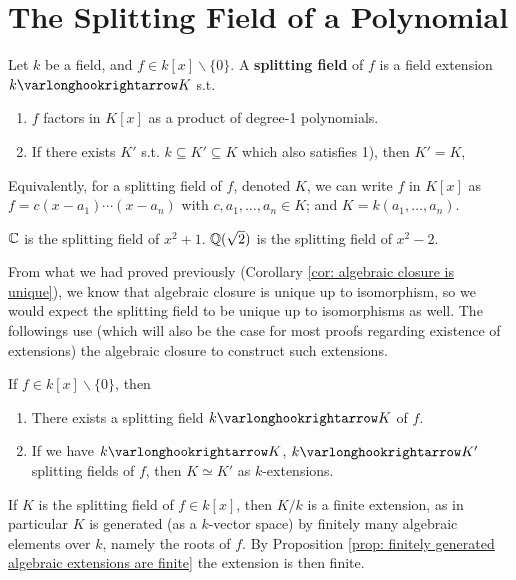\section{The Splitting Field of a Polynomial}

\begin{definition}
    Let $k$ be a field, and $f \in k[x] \smallsetminus \{0\}$. A \textbf{splitting field} of $f$ is a field extension $k \ext K$ s.t. 
    \begin{enumerate}[label=\arabic*)]
        \item $f$ factors in $K[x]$ as a product of degree-1 polynomials.
        \item If there exists $K'$ s.t. $k \subseteq K' \subseteq K$ which also satisfies 1), then $K' = K$,
    \end{enumerate}
    Equivalently, for a splitting field of $f$, denoted $K$, we can write $f$ in $K[x]$ as $f = c(x - a_1) \cdots (x - a_n)$ with $c, a_1, \dots, a_n \in K$; and $K = k(a_1, \dots, a_n)$. 
\end{definition}

\begin{example}
    $\mathbb{C}$ is the splitting field of $x^2 + 1$. $\mathbb{Q}(\sqrt{2})$ is the splitting field of $x^2 - 2$.
\end{example}

\textstart
From what we had proved previously (Corollary \ref{cor: algebraic closure is unique}), we know that algebraic closure is unique up to isomorphism, so we would expect the splitting field to be unique up to isomorphisms as well. The followings use (which will also be the case for most proofs regarding existence of extensions) the algebraic closure to construct such extensions.

\begin{theorem}\label{thm: splitting field is unique}
    If $f \in k[x] \smallsetminus \{0\}$, then
    \begin{enumerate}
        \item There exists a splitting field $k \ext K$ of $f$.
        \item If we have $k \ext K$, $k \ext K'$ splitting fields of $f$, then $K \simeq K'$ as $k$-extensions.
    \end{enumerate}
\end{theorem}

\begin{remark}
    If $K$ is the splitting field of $f \in k[x]$, then $K/k$ is a finite extension, as in particular $K$ is generated (as a $k$-vector space) by finitely many algebraic elements over $k$, namely the roots of $f$. By Proposition \ref{prop: finitely generated algebraic extensions are finite} the extension is then finite.
\end{remark}

